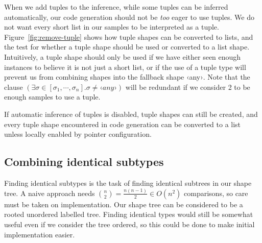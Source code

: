 When we add tuples to the inference, while some tuples can be inferred automatically, our code generation should not be \emph{too} eager to use tuples. We do not want every short list in our samples to be interpreted as a tuple. Figure~\ref{fig:remove-tuple} shows how tuple shapes can be converted to lists, and the test for whether a tuple shape should be used or converted to a list shape. Intuitively, a tuple shape should only be used if we have either seen enough instances to believe it is not just a short list, or if the use of a tuple type will prevent us from combining shapes into the fallback shape ‹any›. Note that the clause $(\exists \sigma \in [\sigma_1, \cdots, \sigma_n] . \sigma \neq ‹any›)$ will be redundant if we consider 2 to be enough samples to use a tuple.

If automatic inference of tuples is disabled, tuple shapes can still be created, and every tuple shape encountered in code generation can be converted to a list unless locally enabled by pointer configuration.

\subsection{Combining identical subtypes}

Finding identical subtypes is the task of finding identical subtrees in our shape tree. A naive approach needs $\binom{n}{2} = \frac{n(n-1)}{2} \in O(n^2)$ comparisons, so care must be taken on implementation. Our shape tree can be considered to be a rooted unordered labelled tree. Finding identical types would still be somewhat useful even if we consider the tree ordered, so this could be done to make initial implementation easier.

